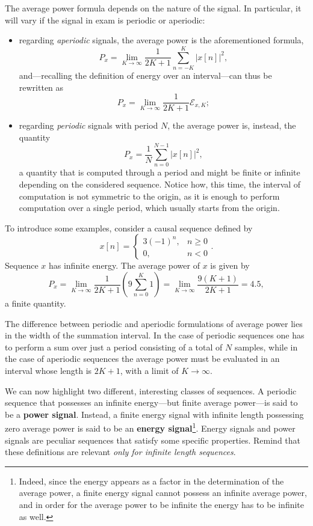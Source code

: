 \documentclass[\documentfontsize, twocolumn]{\classname}
\begin{document}
The average power formula depends on the nature of the signal. In particular, it will vary if the signal in exam is periodic or aperiodic:
\begin{itemize}
    \item regarding \emph{aperiodic} signals, the average power is the aforementioned formula,
        \[ P_x = \lim_{K \rightarrow \infty} \frac{1}{2K + 1} \sum_{n = -K}^K |x[n]|^2, \]
    and---recalling the definition of energy over an interval---can thus be rewritten as
    \[ P_x = \lim_{K \rightarrow \infty} \frac{1}{2K + 1} \mathcal E_{x,K}; \]
    \item regarding \emph{periodic} signals with period $N$, the average power is, instead, the quantity
        \[P_x = \frac{1}{N} \sum_{n = 0}^{N-1} |x[n]|^2,\] a quantity that is computed through a period and might be finite or infinite depending on the considered sequence. Notice how, this time, the interval of computation is not symmetric to the origin, as it is enough to perform computation over a single period, which usually starts from the origin.
\end{itemize}

To introduce some examples, consider a causal se\-quen\-ce defined by \[ x[n] = \left\{\begin{array}{lc}3(-1)^n, & n \geq 0\\ 0, & n < 0\end{array}\right. .\] Se\-quen\-ce $x$ has infinite energy. The average power of $x$ is given by \[P_x = \lim_{K\rightarrow \infty}\frac{1}{2K+1}\left(9\sum_{n=0}^K 1\right) = \lim_{K\rightarrow \infty}\frac{9(K+1)}{2K+1} = 4.5,\] a finite quantity.

The difference between periodic and aperiodic formulations of average power lies in the width of the summation interval. In the case of periodic sequences one has to perform a sum over just a period consisting of a total of $N$ samples, while in the case of aperiodic sequences the average power must be evaluated in an interval whose length is $2K + 1$, with a limit of $K \rightarrow \infty$.

We can now highlight two different, interesting classes of sequences. A periodic se\-quen\-ce that possesses an infinite energy---but finite average power---is said to be a \textbf{power signal}. Instead, a finite energy signal with infinite length possessing zero average power is said to be an \textbf{energy signal}\footnote{Indeed, since the energy appears as a factor in the determination of the average power, a finite energy signal cannot possess an infinite average power, and in order for the average power to be infinite the energy has to be infinite as well.}. Energy signals and power signals are peculiar se\-quen\-ces that satisfy some specific properties. Remind that these definitions are relevant \emph{only for infinite length sequences}.
\end{document}
